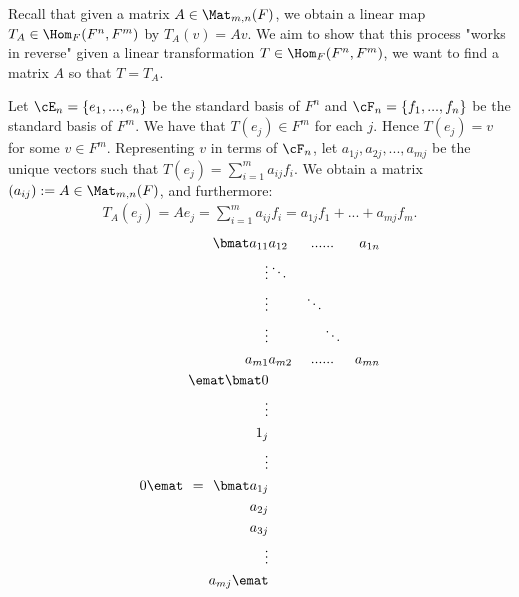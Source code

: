     \begin{example}
        Recall that given a matrix $A \in \Mat_{m,n}(F)$, we obtain a linear map $T_A \in \Hom_F{(F^n, F^m)}$ by $T_A(v) = Av$. We aim to show that this process "works in reverse" \textemdash given a linear transformation $T \in \Hom_F{(F^n,F^m)}$, we want to find a matrix $A$ so that $T = T_A$.

        Let $\cE_n = \{e_1,...,e_n\}$ be the standard basis of $F^n$ and $\cF_n = \{f_1,...,f_n\}$ be the standard basis of $F^m$. We have that $T(e_j) \in F^m$ for each $j$. Hence $T(e_j) = v$ for some $v \in F^m$. Representing $v$ in terms of $\cF_n$, let $a_{1j},a_{2j},...,a_{mj}$ be the unique vectors such that $T(e_j) = \sum_{i = 1}^m a_{ij}f_i$. We obtain a matrix $(a_{ij}) := A \in \Mat_{m,n}(F)$, and furthermore:
            \begin{equation*}
            \begin{split}
                T_A(e_j) = A e_j = \sum_{i = 1}^m a_{ij}f_i = a_{1j}f_1 + ... + a_{mj}f_m.
            \end{split}
            \end{equation*}
            \begin{equation*}
            \begin{split}
                \bmat 
                a_{11} & a_{12} & ... & ... &a_{1n} \\
                \vdots & \ddots & & \\
                \vdots & & \ddots & \\
                \vdots & & & \ddots \\
                a_{m1} & a_{m2} & ... & ... &a_{mn} \\
                \emat
                \bmat
                0 \\ \vdots \\ 1_j \\ \vdots \\ 0 
                \emat \hspace{4pt}=\hspace{4pt}
                \bmat
                a_{1j} \\ a_{2j} \\ a_{3j} \\ \vdots \\  a_{mj}
                \emat
            \end{split}
            \end{equation*}
        
    \end{example}

